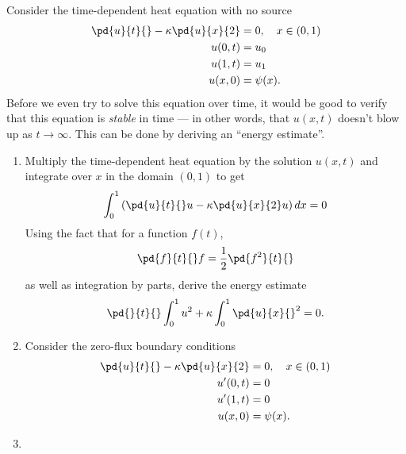 Consider the time-dependent heat equation with no source
\begin{align*}
\pd{u}{t}{}-\kappa\pd{u}{x}{2} &= 0, \quad x\in (0,1)\\
u(0,t) &= u_0\\
u(1,t) &= u_1\\
u(x,0) &= \psi(x).
\end{align*}
Before we even try to solve this equation over time, it would be good to verify that this equation is \textit{stable} in time --- in other words, that $u(x,t)$ doesn't blow up as $t\rightarrow \infty$.  This can be done by deriving an ``energy estimate''.
\begin{enumerate}
\item Multiply the time-dependent heat equation by the solution $u(x,t)$ and integrate over $x$ in the domain $(0,1)$ to get
\[
\int_0^1 \left(\pd{u}{t}{}u - \kappa\pd{u}{x}{2}u\right) dx= 0
\]
Using the fact that for a function $f(t)$, 
\[
\pd{f}{t}{}f = \frac{1}{2}\pd{f^2}{t}{}
\]
as well as integration by parts, derive the energy estimate
\[
\pd{}{t}{} \int_0^1 u^2 + \kappa \int_0^1 \pd{u}{x}{}^2 = 0.
\]
\item Consider the zero-flux boundary conditions
\begin{align*}
\pd{u}{t}{}-\kappa\pd{u}{x}{2} &= 0, \quad x\in (0,1)\\
u'(0,t) &= 0\\
u'(1,t) &= 0\\
u(x,0) &= \psi(x).
\end{align*}

\item 
%
\end{enumerate}





